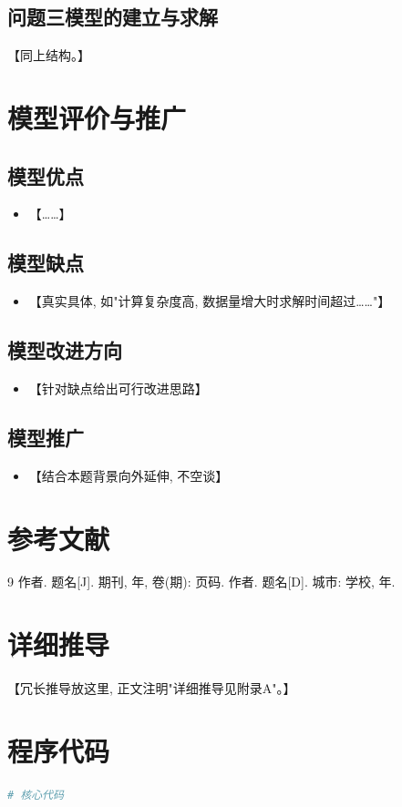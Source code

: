 \documentclass[11pt]{ctexart}
\begin{document}
\subsection{问题三模型的建立与求解}
【同上结构。】

\section{模型评价与推广}
\subsection{模型优点}
\begin{itemize}
  \item 【……】
\end{itemize}
\subsection{模型缺点}
\begin{itemize}
  \item 【真实具体, 如"计算复杂度高, 数据量增大时求解时间超过……"】
\end{itemize}
\subsection{模型改进方向}
\begin{itemize}
  \item 【针对缺点给出可行改进思路】
\end{itemize}
\subsection{模型推广}
\begin{itemize}
  \item 【结合本题背景向外延伸, 不空谈】
\end{itemize}

\section{参考文献}
\begin{thebibliography}{9}
   作者. 题名[J]. 期刊, 年, 卷(期): 页码.
   作者. 题名[D]. 城市: 学校, 年.
\end{thebibliography}

\appendix
\section{详细推导}
【冗长推导放这里, 正文注明"详细推导见附录A"。】

\section{程序代码}
\begin{lstlisting}[language=Python]
# 核心代码
\end{lstlisting}
\end{document}
